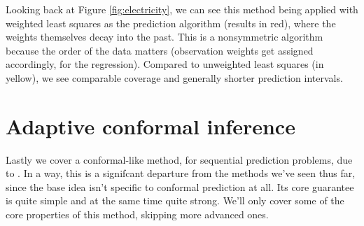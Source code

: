 \documentclass{article}
\begin{document}
Looking back at Figure \ref{fig:electricity}, we can see this method being
applied with weighted least squares as the prediction algorithm (results in
red), where the weights themselves decay into the past. This is a nonsymmetric
algorithm because the order of the data matters (observation weights get
assigned accordingly, for  the regression). Compared to unweighted least squares
(in yellow), we see comparable coverage and generally shorter prediction
intervals. 

\section{Adaptive conformal inference}

\def\err{\text{err}}

Lastly we cover a conformal-like method, for sequential prediction problems, due 
to \citet{gibbs2021adaptive}. In a way, this is a signifcant departure from the
methods we've seen thus far, since the base idea isn't specific to conformal
prediction at all. Its core guarantee is quite simple and at the same time quite
strong. We'll only cover some of the core properties of this method, skipping
more advanced ones. 
\end{document}
